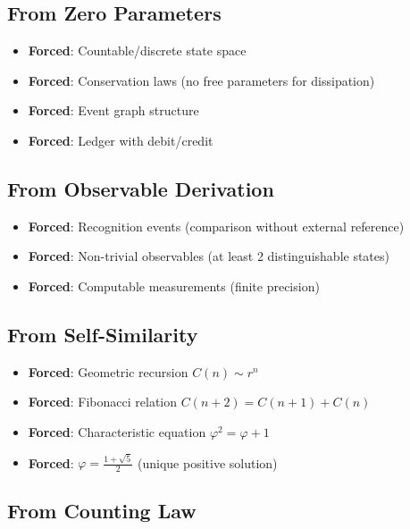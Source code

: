 \documentclass[11pt]{article}
\theoremstyle{definition}
\theoremstyle{remark}
\begin{document}
\subsection{From Zero Parameters}

\begin{itemize}
\item[\checkmark] \textbf{Forced}: Countable/discrete state space
\item[\checkmark] \textbf{Forced}: Conservation laws (no free parameters for dissipation)
\item[\checkmark] \textbf{Forced}: Event graph structure
\item[\checkmark] \textbf{Forced}: Ledger with debit/credit
\end{itemize}

\subsection{From Observable Derivation}

\begin{itemize}
\item[\checkmark] \textbf{Forced}: Recognition events (comparison without external reference)
\item[\checkmark] \textbf{Forced}: Non-trivial observables (at least 2 distinguishable states)
\item[\checkmark] \textbf{Forced}: Computable measurements (finite precision)
\end{itemize}

\subsection{From Self-Similarity}

\begin{itemize}
\item[\checkmark] \textbf{Forced}: Geometric recursion $C(n) \sim r^n$
\item[\checkmark] \textbf{Forced}: Fibonacci relation $C(n+2) = C(n+1) + C(n)$
\item[\checkmark] \textbf{Forced}: Characteristic equation $\varphi^2 = \varphi + 1$
\item[\checkmark] \textbf{Forced}: $\varphi = \frac{1+\sqrt{5}}{2}$ (unique positive solution)
\end{itemize}

\subsection{From Counting Law}
\end{document}
